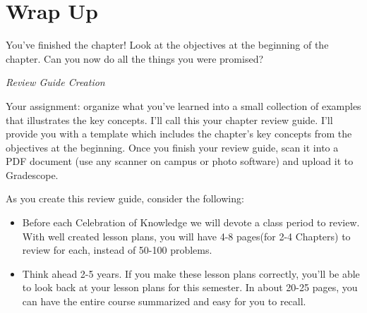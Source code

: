 \documentclass[10pt,]{book}
\theoremstyle{plain}
\theoremstyle{definition}
\theoremstyle{definition}
\theoremstyle{definition}
\theoremstyle{definition}
\theoremstyle{definition}
\numberwithin{equation}{section}
\begin{document}
\section*{Wrap Up}
You've finished the chapter! Look at the objectives at the beginning of the chapter. Can you now do all the things you were promised?%
\par
\emph{Review Guide Creation}%
\par
Your assignment: organize what you've learned into a small collection of examples that illustrates the key concepts. I'll call this your chapter review guide. I'll provide you with a template which includes the chapter's key concepts from the objectives at the beginning. Once you finish your review guide, scan it into a PDF document (use any scanner on campus or photo software) and upload it to Gradescope. %
\par
As you create this review guide, consider the following: \leavevmode%
\begin{itemize}[label=\textbullet]
\item{}Before each Celebration of Knowledge  we will devote a class period to review. With well created lesson plans, you will have 4-8 pages(for 2-4 Chapters) to review for each, instead of 50-100 problems.%
\item{}Think ahead 2-5 years. If you make these lesson plans correctly, you'll be able to look back at your lesson plans for this semester. In about 20-25 pages, you can have the entire course summarized and easy for you to recall.%
\end{itemize}
%
\typeout{************************************************}
\typeout{************************************************}
\end{document}
